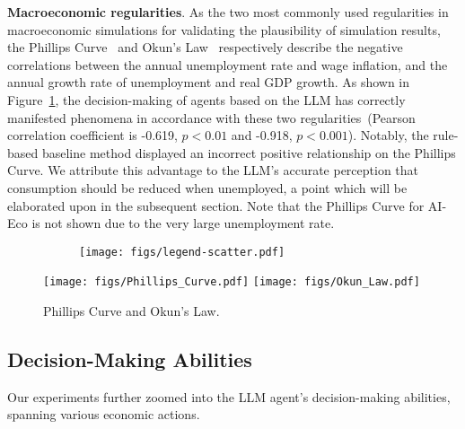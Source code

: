 \textbf{Macroeconomic regularities}. As the two most commonly used regularities in macroeconomic simulations for validating the plausibility of simulation results, the Phillips Curve~\cite{phelps1967phillips} and Okun's Law~\cite{okun1963potential} respectively describe the negative correlations between the annual unemployment rate and wage inflation, and the annual growth rate of unemployment and real GDP growth. As shown in Figure~\ref{fig::correlation-curves}, the decision-making of agents based on the LLM has correctly manifested phenomena in accordance with these two regularities~(Pearson correlation coefficient is -0.619, $p<0.01$ and -0.918, $p<0.001$). Notably, the rule-based baseline method displayed an incorrect positive relationship on the Phillips Curve. We attribute this advantage to the LLM's accurate perception that consumption should be reduced when unemployed, a point which will be elaborated upon in the subsequent section. Note that the Phillips Curve for AI-Eco is not shown due to the very large unemployment rate.
\begin{figure}[t]
\centering
\begin{subfigure}{0.8\columnwidth}
    \texttt{[image: figs/legend-scatter.pdf]}
\end{subfigure}

\texttt{[image: figs/Phillips\_Curve.pdf]}
\texttt{[image: figs/Okun\_Law.pdf]}
\caption{Phillips Curve and Okun's Law.} \label{fig::correlation-curves}
\end{figure}

\subsection{Decision-Making Abilities}
Our experiments further zoomed into the LLM agent's decision-making abilities, spanning various economic actions.
